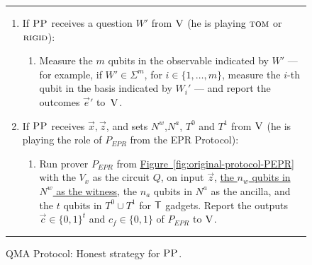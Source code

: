 \documentclass[11pt]{article}
\numberwithin{equation}{section}
\theoremstyle{definition}
\theoremstyle{plain}
\newcommand{\expref}[2]{\hyperref[#2]{#1~\ref{#2}}}
\newcommand{\rigid}{\textsc{rigid}}
\newcommand{\tom}{\textsc{tom}}
\newcommand{\ver}{\textsc{V}}
\newcommand{\pp}{\textsc{PP}}
\newcommand{\highlight}[1]{\uline{#1}}
\begin{document}
\begin{figure}[H]
\rule[1ex]{\textwidth}{0.5pt}
\vspace{-20pt}
\begin{enumerate}
\setlength\itemsep{-0.17em}   %
\item If $\pp$ receives a question ${W}'$ from $\ver$ (he is playing $\tom$ or $\rigid$):
\vspace{-0.2cm}  %
\begin{enumerate}
     \item[]  Measure the $m$ qubits in the observable indicated by $W'$ --- for example, if $W'\in\Sigma^m$, for $i\in \{1,\ldots,m\}$, measure the $i$-th qubit in the basis indicated by $W_i'$ --- and report
       the outcomes $\vec{e}'$ to~$\ver$.
\end{enumerate}
\item If $\pp$ receives $\vec{x}, \vec{z}$, and sets $N^w$,$N^a$, $T^0$ and $T^1$ from $\ver$ (he is playing the role of $P_{EPR}$ from the EPR Protocol):
\vspace{-0.2cm}  %
\begin{enumerate}
     \item[] Run  prover $P_{EPR}$ from
\expref{Figure}{fig:original-protocol-PEPR} with the $V_x$ as the circuit $Q$, on input $\vec{z}$, \highlight{the $n_w$ qubits in $N^w$ as the witness}, the $n_a$ qubits in 
        $N^a$ as the ancilla, and the $t$ qubits in $T^0\cup T^1$ for $\sf T$ gadgets.
     Report the outputs $\vec{c}\in\{0,1\}^t$ and $c_f\in\{0,1\}$ of $P_{EPR}$  to $\ver$. 
\end{enumerate}
\end{enumerate}
\rule[2ex]{\textwidth}{0.5pt}\vspace{-.5cm}
\caption{QMA Protocol: Honest strategy for $\pp$.}\label{fig:qma-protocol-PP}
\end{figure}

\clearpage
\end{document}
